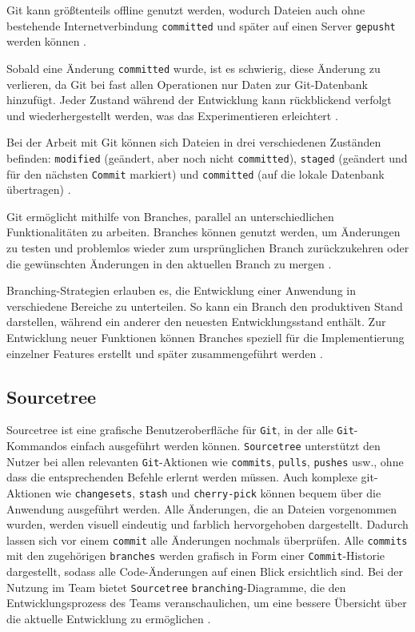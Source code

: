 \documentclass[oneside]{ausarbeitung}
\begin{document}
Git kann größtenteils offline genutzt werden, wodurch Dateien auch ohne bestehende Internetverbindung \texttt{committed} und später auf einen Server \texttt{gepusht} werden können \parencite{git_intro}.

Sobald eine Änderung \texttt{committed} wurde, ist es schwierig, diese Änderung zu verlieren, da Git bei fast allen Operationen nur Daten zur Git-Datenbank hinzufügt. Jeder Zustand während der Entwicklung kann rückblickend verfolgt und wiederhergestellt werden, was das Experimentieren erleichtert \parencite{git_intro}.

Bei der Arbeit mit Git können sich Dateien in drei verschiedenen Zuständen befinden: \texttt{modified} (geändert, aber noch nicht \texttt{committed}), \texttt{staged} (geändert und für den nächsten \texttt{Commit} markiert) und \texttt{committed} (auf die lokale Datenbank übertragen) \parencite{git_intro}.

Git ermöglicht mithilfe von Branches, parallel an unterschiedlichen Funktionalitäten zu arbeiten. Branches können genutzt werden, um Änderungen zu testen und problemlos wieder zum ursprünglichen Branch zurückzukehren oder die gewünschten Änderungen in den aktuellen Branch zu mergen \parencite{git-branching-merging}.

Branching-Strategien erlauben es, die Entwicklung einer Anwendung in verschiedene Bereiche zu unterteilen. So kann ein Branch den produktiven Stand darstellen, während ein anderer den neuesten Entwicklungsstand enthält. Zur Entwicklung neuer Funktionen können Branches speziell für die Implementierung einzelner Features erstellt und später zusammengeführt werden \parencite{git-branching-merging}.

\subsection{Sourcetree}
Sourcetree ist eine grafische Benutzeroberfläche für \texttt{Git}, in der alle \texttt{Git}-Kommandos einfach ausgeführt werden können. \texttt{Sourcetree} unterstützt den Nutzer bei allen relevanten \texttt{Git}-Aktionen wie \texttt{commits}, \texttt{pulls}, \texttt{pushes} usw., ohne dass die entsprechenden Befehle erlernt werden müssen. Auch komplexe git-Aktionen wie \texttt{changesets}, \texttt{stash} und \texttt{cherry-pick} können bequem über die Anwendung ausgeführt werden.
Alle Änderungen, die an Dateien vorgenommen wurden, werden visuell eindeutig und farblich hervorgehoben dargestellt. Dadurch lassen sich vor einem \texttt{commit} alle Änderungen nochmals überprüfen.
Alle \texttt{commits} mit den zugehörigen \texttt{branches} werden grafisch in Form einer \texttt{Commit}-Historie dargestellt, sodass alle Code-Änderungen auf einen Blick ersichtlich sind.
Bei der Nutzung im Team bietet \texttt{Sourcetree} \texttt{branching}-Diagramme, die den Entwicklungsprozess des Teams veranschaulichen, um eine bessere Übersicht über die aktuelle Entwicklung zu ermöglichen \parencite{sourcetree}. 
\end{document}
